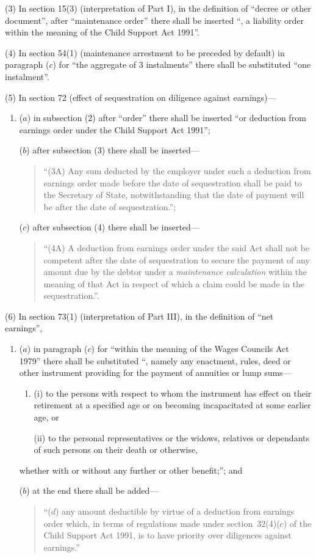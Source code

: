 \documentclass[12pt,a4paper]{article}
\begin{document}
(3) In section 15(3)  (interpretation of Part I), in the definition of “decree or other document”, after “maintenance order” there shall be inserted “, a liability order within the meaning of the Child Support Act 1991”.

(4) In section 54(1)  (maintenance arrestment to be preceded by default) in paragraph ($c$)  for “the aggregate of 3 instalments” there shall be substituted “one instalment”.

(5) In section 72 (effect of sequestration on diligence against earnings)—
\begin{enumerate}\item[]
($a$) in subsection (2)  after “order” there shall be inserted “or deduction from earnings order under the Child Support Act 1991”;

($b$) after subsection (3)  there shall be inserted—
\begin{quotation}
“(3A) Any sum deducted by the employer under such a deduction from earnings order made before the date of sequestration shall be paid to the Secretary of State, notwithstanding that the date of payment will be after the date of sequestration.”;
\end{quotation}

($c$) after subsection (4)  there shall be inserted—
\begin{quotation}
“(4A) A deduction from earnings order under the said Act shall not be competent after the date of sequestration to secure the payment of any amount due by the debtor under a 
\emph{maintenance calculation}  %
within the meaning of that Act in respect of which a claim could be made in the sequestration.”.
\end{quotation}
\end{enumerate}

(6) In section 73(1)  (interpretation of Part III), in the definition of “net earnings”,
\begin{enumerate}\item[]
($a$) in paragraph ($c$)  for “within the meaning of the Wages Councils Act 1979” there shall be substituted “, namely any enactment, rules, deed or other instrument providing for the payment of annuities or lump sums—
\begin{enumerate}\item[]
(i) to the persons with respect to whom the instrument has effect on their retirement at a specified age or on becoming incapacitated at some earlier age, or

(ii) to the personal representatives or the widows, relatives or dependants of such persons on their death or otherwise,
\end{enumerate}
whether with or without any further or other benefit;”; and

($b$) at the end there shall be added—
\begin{quotation}
“($d$) any amount deductible by virtue of a deduction from earnings order which, in terms of regulations made under section~32(4)($c$)  of the Child Support Act 1991, is to have priority over diligences against earnings.”
\end{quotation}
\end{enumerate}
\end{document}
